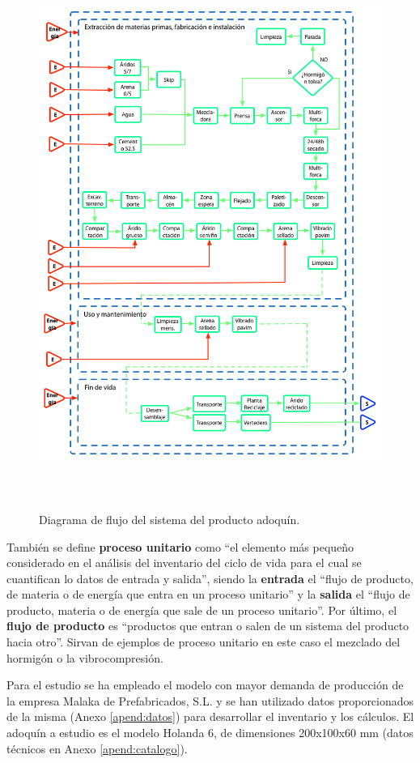 \begin{figure}[!htp]
\centering
\includegraphics[height=18cm]{img/sistema.png}
\caption{Diagrama de flujo del sistema del producto adoquín.}
\label{fig:sistema}
\end{figure}

También se define \textbf{proceso unitario} como ``el elemento más pequeño considerado en el análisis del inventario del ciclo de vida para el cual se cuantifican lo datos de entrada y salida'', siendo la \textbf{entrada} el ``flujo de producto, de materia o de energía que entra en un proceso unitario'' y la \textbf{salida} el ``flujo de producto, materia o de energía que sale de un proceso unitario''. Por último, el \textbf{flujo de producto} es ``productos que entran o salen de un sistema del producto hacia otro''. Sirvan de ejemplos de proceso unitario en este caso el mezclado del hormigón o la vibrocompresión.

Para el estudio se ha empleado el modelo con mayor demanda de producción de la empresa Malaka de Prefabricados, S.L. y se han utilizado datos proporcionados de la misma (Anexo \ref{apend:datos}) para desarrollar el inventario y los cálculos. El adoquín a estudio es el modelo Holanda 6, de dimensiones 200x100x60 \si{mm} (datos técnicos en Anexo \ref{apend:catalogo}).

